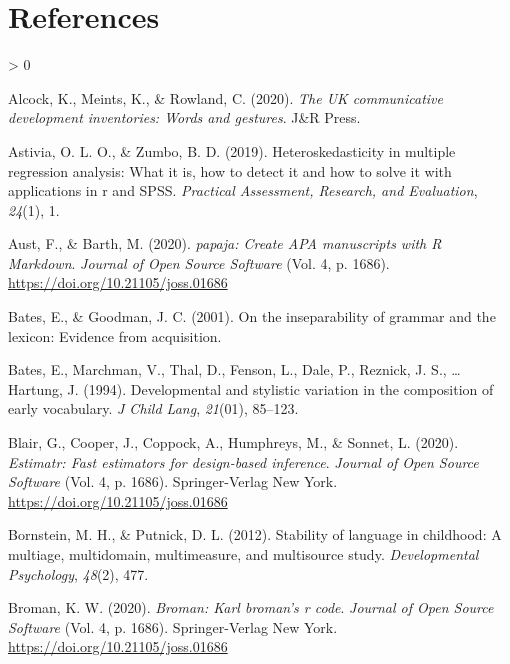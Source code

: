\documentclass[
  english,
  ,man,floatsintext]{apa6}
\newlength{\cslhangindent}
\newenvironment{CSLReferences}[2] %
 {%
  \setlength{\parindent}{0pt}
  \ifodd #1 \everypar{\setlength{\hangindent}{\cslhangindent}}\ignorespaces\fi
  \ifnum #2 > 0
  \setlength{\parskip}{#2\baselineskip}
  \fi
 }%
 {}
\begin{document}
\newpage

\hypertarget{references}{%
\section{References}\label{references}}

\begingroup
\setlength{\parindent}{-0.5in}
\setlength{\leftskip}{0.5in}

\hypertarget{refs}{}
\begin{CSLReferences}{1}{0}
\leavevmode\hypertarget{ref-Alcock2020}{}%
Alcock, K., Meints, K., \& Rowland, C. (2020). \emph{The UK communicative development inventories: Words and gestures}. J\&R Press.

\leavevmode\hypertarget{ref-Astivia2019}{}%
Astivia, O. L. O., \& Zumbo, B. D. (2019). Heteroskedasticity in multiple regression analysis: What it is, how to detect it and how to solve it with applications in r and SPSS. \emph{Practical Assessment, Research, and Evaluation}, \emph{24}(1), 1.

\leavevmode\hypertarget{ref-R-papaja}{}%
Aust, F., \& Barth, M. (2020). \emph{{papaja}: {Create} {APA} manuscripts with {R Markdown}}. \emph{Journal of Open Source Software} (Vol. 4, p. 1686). \url{https://doi.org/10.21105/joss.01686}

\leavevmode\hypertarget{ref-Bates2001}{}%
Bates, E., \& Goodman, J. C. (2001). On the inseparability of grammar and the lexicon: Evidence from acquisition.

\leavevmode\hypertarget{ref-bates1994}{}%
Bates, E., Marchman, V., Thal, D., Fenson, L., Dale, P., Reznick, J. S., \ldots{} Hartung, J. (1994). Developmental and stylistic variation in the composition of early vocabulary. \emph{J Child Lang}, \emph{21}(01), 85--123.

\leavevmode\hypertarget{ref-R-estimatr}{}%
Blair, G., Cooper, J., Coppock, A., Humphreys, M., \& Sonnet, L. (2020). \emph{Estimatr: Fast estimators for design-based inference}. \emph{Journal of Open Source Software} (Vol. 4, p. 1686). Springer-Verlag New York. \url{https://doi.org/10.21105/joss.01686}

\leavevmode\hypertarget{ref-bornstein2012}{}%
Bornstein, M. H., \& Putnick, D. L. (2012). Stability of language in childhood: A multiage, multidomain, multimeasure, and multisource study. \emph{Developmental Psychology}, \emph{48}(2), 477.

\leavevmode\hypertarget{ref-R-broman}{}%
Broman, K. W. (2020). \emph{Broman: Karl broman's r code}. \emph{Journal of Open Source Software} (Vol. 4, p. 1686). Springer-Verlag New York. \url{https://doi.org/10.21105/joss.01686}


\end{CSLReferences}
\end{document}
